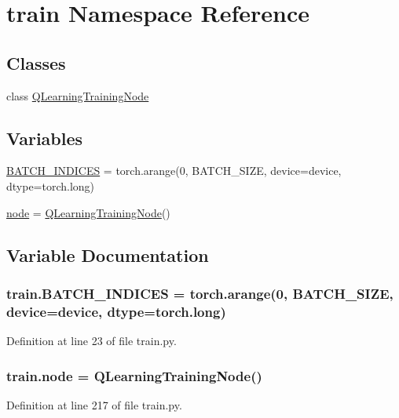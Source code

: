 \hypertarget{namespacetrain}{}\section{train Namespace Reference}
\label{namespacetrain}
\subsection*{Classes}
\begin{DoxyCompactItemize}
\item 
class \hyperlink{classtrain_1_1_q_learning_training_node}{Q\+Learning\+Training\+Node}
\end{DoxyCompactItemize}
\subsection*{Variables}
\begin{DoxyCompactItemize}
\item 
\hyperlink{namespacetrain_ab5b44727ca7567b7191d18956f4c4e64}{B\+A\+T\+C\+H\+\_\+\+I\+N\+D\+I\+C\+ES} = torch.\+arange(0, B\+A\+T\+C\+H\+\_\+\+S\+I\+ZE, device=device, dtype=torch.\+long)
\item 
\hyperlink{namespacetrain_a7c68a6981d3c74c76920e856fc7c2419}{node} = \hyperlink{classtrain_1_1_q_learning_training_node}{Q\+Learning\+Training\+Node}()
\end{DoxyCompactItemize}


\subsection{Variable Documentation}
\subsubsection[{\texorpdfstring{B\+A\+T\+C\+H\+\_\+\+I\+N\+D\+I\+C\+ES}{BATCH_INDICES}}]{\setlength{\rightskip}{0pt plus 5cm}train.\+B\+A\+T\+C\+H\+\_\+\+I\+N\+D\+I\+C\+ES = torch.\+arange(0, B\+A\+T\+C\+H\+\_\+\+S\+I\+ZE, device=device, dtype=torch.\+long)}\hypertarget{namespacetrain_ab5b44727ca7567b7191d18956f4c4e64}{}\label{namespacetrain_ab5b44727ca7567b7191d18956f4c4e64}


Definition at line 23 of file train.\+py.

\subsubsection[{\texorpdfstring{node}{node}}]{\setlength{\rightskip}{0pt plus 5cm}train.\+node = {\bf Q\+Learning\+Training\+Node}()}\hypertarget{namespacetrain_a7c68a6981d3c74c76920e856fc7c2419}{}\label{namespacetrain_a7c68a6981d3c74c76920e856fc7c2419}


Definition at line 217 of file train.\+py.

